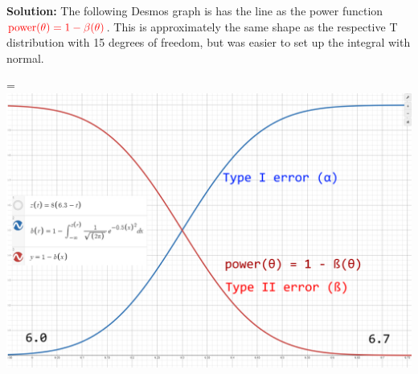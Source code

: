 \begin{enumerate}[label=(\alph*)]
    \nnl \textbf{Solution: } The following Desmos graph is has the  line as the power function $\color{red}{\operatorname{power}(\theta) = 1-\beta(\theta)}\color{black}$. This is approximately the same shape as the respective T distribution with 15 degrees of freedom, but was easier to set up the integral with normal.
    \makeatletter
    \begingroup   %
    \par        %
    \@totalleftmargin=0pt \linewidth=\columnwidth
    \includegraphics[width=6.5in]{prob1.PNG}
    \par      %
  \endgroup
    
\end{enumerate}